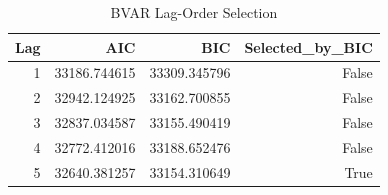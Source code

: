 \begin{table}
\caption{BVAR Lag-Order Selection}
\label{tab:4.7}
\begin{tabular}{rrrr}
\toprule
Lag & AIC & BIC & Selected_by_BIC \\
\midrule
1 & 33186.744615 & 33309.345796 & False \\
2 & 32942.124925 & 33162.700855 & False \\
3 & 32837.034587 & 33155.490419 & False \\
4 & 32772.412016 & 33188.652476 & False \\
5 & 32640.381257 & 33154.310649 & True \\
\bottomrule
\end{tabular}
\end{table}
